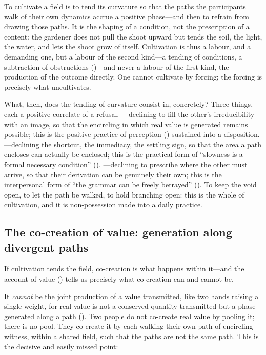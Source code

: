 \begin{claim}
To cultivate a field is to tend its curvature so that the paths the participants walk of their own dynamics accrue a positive phase---and then to refrain from drawing those paths. It is the shaping of a condition, not the prescription of a content: the gardener does not pull the shoot upward but tends the soil, the light, the water, and lets the shoot grow of itself. Cultivation is thus a labour, and a demanding one, but a labour of the second kind---a tending of conditions, a subtraction of obstructions ()---and never a labour of the first kind, the production of the outcome directly. One cannot cultivate by forcing; the forcing is precisely what uncultivates.
\end{claim}

What, then, does the tending of curvature consist in, concretely? Three things, each a positive correlate of a refusal. ---declining to fill the other's irreducibility with an image, so that the encircling in which real value is generated remains possible; this is the positive practice of perception () sustained into a disposition. ---declining the shortcut, the immediacy, the settling sign, so that the area a path encloses can actually be enclosed; this is the practical form of ``slowness is a formal necessary condition'' (). ---declining to prescribe where the other must arrive, so that their derivation can be genuinely their own; this is the interpersonal form of ``the grammar can be freely betrayed'' (). To keep the void open, to let the path be walked, to hold branching open: this is the whole of cultivation, and it is non-possession made into a daily practice.

\subsection{The co-creation of value: generation along divergent paths}
\label{p09:sec:cocreation-proper}

If cultivation tends the field, co-creation is what happens within it---and the account of value () tells us precisely what co-creation can and cannot be.

It \emph{cannot} be the joint production of a value transmitted, like two hands raising a single weight, for real value is not a conserved quantity transmitted but a phase generated along a path (). Two people do not co-create real value by pooling it; there is no pool. They co-create it by each walking their own path of encircling witness, within a shared field, such that the paths are not the same path. This is the decisive and easily missed point:

